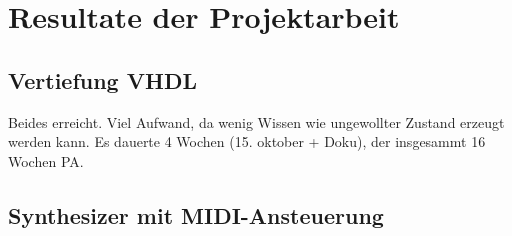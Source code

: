 
\chapter{Resultate der Projektarbeit}\label{chap.resultate}



\section{Vertiefung VHDL}\label{sect.resultatePA}
Beides erreicht. Viel Aufwand, da wenig Wissen wie ungewollter Zustand erzeugt werden kann.
Es dauerte 4 Wochen (15. oktober + Doku), der insgesammt 16 Wochen PA.

\section{Synthesizer mit MIDI-Ansteuerung}\label{sect.resultatePA}


